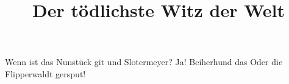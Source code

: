 \documentclass[a4paper]{article}
\title{Der tödlichste Witz der Welt}
\begin{document}
\maketitle

\huge

Wenn ist das Nunstück git und Slotermeyer? Ja! Beiherhund das Oder die
Flipperwaldt gersput!
\end{document}
